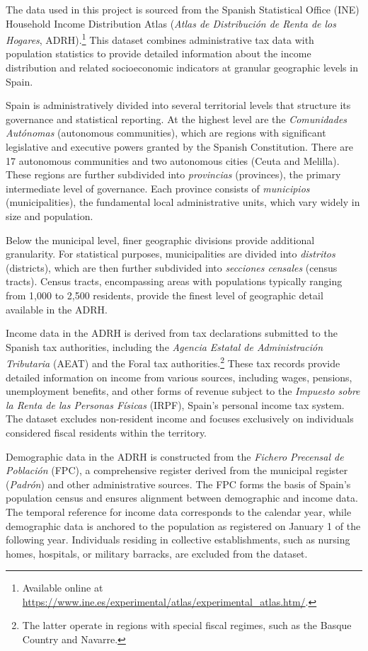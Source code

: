 
The data used in this project is sourced from the Spanish Statistical Office (INE) Household Income Distribution Atlas (\textit{Atlas de Distribución de Renta de los Hogares}, ADRH).\footnote{Available online at \href{https://www.ine.es/experimental/atlas/experimental_atlas.htm/}{https://www.ine.es/experimental/atlas/experimental\_atlas.htm/}.} This dataset combines administrative tax data with population statistics to provide detailed information about the income distribution and related socioeconomic indicators at granular geographic levels in Spain.

Spain is administratively divided into several territorial levels that structure its governance and statistical reporting. At the highest level are the \textit{Comunidades Autónomas} (autonomous communities), which are regions with significant legislative and executive powers granted by the Spanish Constitution. There are 17 autonomous communities and two autonomous cities (Ceuta and Melilla). These regions are further subdivided into \textit{provincias} (provinces), the primary intermediate level of governance. Each province consists of \textit{municipios} (municipalities), the fundamental local administrative units, which vary widely in size and population.

Below the municipal level, finer geographic divisions provide additional granularity. For statistical purposes, municipalities are divided into \textit{distritos} (districts), which are then further subdivided into \textit{secciones censales} (census tracts). Census tracts, encompassing areas with populations typically ranging from 1,000 to 2,500 residents, provide the finest level of geographic detail available in the ADRH.

Income data in the ADRH is derived from tax declarations submitted to the Spanish tax authorities, including the \textit{Agencia Estatal de Administración Tributaria} (AEAT) and the Foral tax authorities.\footnote{The latter operate in regions with special fiscal regimes, such as the Basque Country and Navarre.} These tax records provide detailed information on income from various sources, including wages, pensions, unemployment benefits, and other forms of revenue subject to the \textit{Impuesto sobre la Renta de las Personas Físicas} (IRPF), Spain's personal income tax system. The dataset excludes non-resident income and focuses exclusively on individuals considered fiscal residents within the territory.

Demographic data in the ADRH is constructed from the \textit{Fichero Precensal de Población} (FPC), a comprehensive register derived from the municipal register (\textit{Padrón}) and other administrative sources. The FPC forms the basis of Spain’s population census and ensures alignment between demographic and income data. The temporal reference for income data corresponds to the calendar year, while demographic data is anchored to the population as registered on January 1 of the following year. Individuals residing in collective establishments, such as nursing homes, hospitals, or military barracks, are excluded from the dataset.

